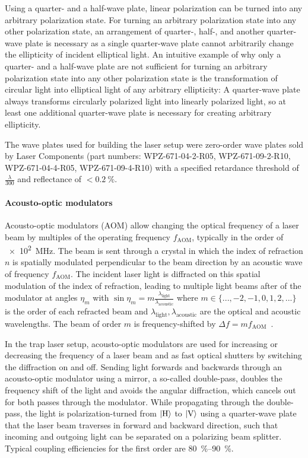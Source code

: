 Using a quarter- and a half-wave plate, linear polarization can be turned into any arbitrary polarization state. For turning an arbitrary polarization state into any other polarization state, an arrangement of quarter-, half-, and another quarter-wave plate is necessary as a single quarter-wave plate cannot arbitrarily change the ellipticity of incident elliptical light. An intuitive example of why only a quarter- and a half-wave plate are not sufficient for turning an arbitrary polarization state into any other polarization state is the transformation of circular light into elliptical light of any arbitrary ellipticity: A quarter-wave plate always transforms circularly polarized light into linearly polarized light, so at least one additional quarter-wave plate is necessary for creating arbitrary ellipticity.

The wave plates used for building the laser setup were zero-order wave plates sold by Laser Components (part numbers:  WPZ-671-04-2-R05, WPZ-671-09-2-R10, WPZ-671-04-4-R05,  WPZ-671-09-4-R10) with a specified retardance threshold of $\frac{\lambda}{300}$ and reflectance of $<\SI{0.2}{\percent}$.
    
\paragraph{Acousto-optic modulators} Acousto-optic modulators (AOM) allow changing the optical frequency of a laser beam by multiples of the operating frequency $f_\text{AOM}$, typically in the order of \SI[]{e2}{\mega\hertz}. The beam is sent through a crystal in which the index of refraction $n$ is spatially modulated perpendicular to the beam direction by an acoustic wave of frequency $f_\text{AOM}$. The incident laser light is diffracted on this spatial modulation of the index of refraction, leading to multiple light beams after of the modulator at angles $\eta_m$ with $\sin \eta_m = m\frac{\lambda_\text{light}}{\lambda_\text{acoustic}}$ where $m \in \{..., -2, -1, 0, 1, 2, ...\}$ is the order of each refracted beam and $\lambda_\text{light}, \lambda_\text{acoustic}$ are the optical and acoustic wavelengths. The beam of order $m$ is frequency-shifted by $\Delta f = mf_\text{AOM}$~\cite{hunsperger_acousto-optic_2002}.

In the trap laser setup, acousto-optic modulators are used for increasing or decreasing the frequency of a laser beam and as fast optical shutters by switching the diffraction on and off. Sending light forwards and backwards through an acousto-optic modulator using a mirror, a so-called double-pass, doubles the frequency shift of the light and avoids the angular diffraction, which cancels out for both passes through the modulator. While propagating through the double-pass, the light is polarization-turned from $\Ket{\text{H}}$ to $\Ket{\text{V}}$ using a quarter-wave plate that the laser beam traverses in forward and backward direction, such that incoming and outgoing light can be separated on a polarizing beam splitter. Typical coupling efficiencies for the first order are \SIrange[]{80}{90}{\percent}.

